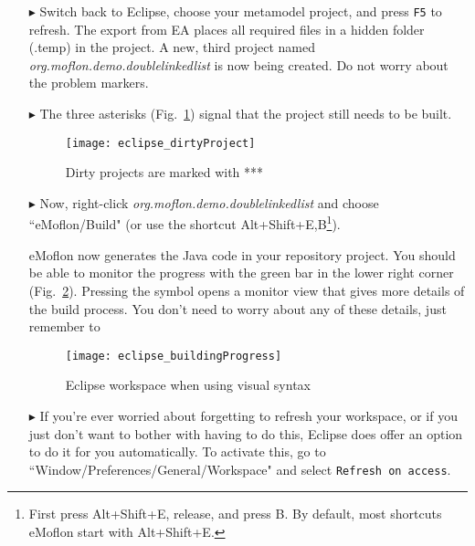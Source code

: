 \begin{itemize}
\item[$\blacktriangleright$] Switch back to Eclipse, choose your metamodel project, and press \texttt{F5} to refresh. 
The export from EA places all required files in a hidden folder (.temp) in the project.
A new, third project named \emph{org.moflon.demo.doublelinkedlist} is now being created.
Do not worry about the problem markers.

\item[$\blacktriangleright$] The three asterisks (Fig.~\ref{eclipse:dirty-project}) signal that the project still needs to be built.

\vspace{0.5cm}

\begin{figure}[htbp]
    \centering
    \texttt{[image: eclipse\_dirtyProject]}
    \caption{Dirty projects are marked with ***} 
    \label{eclipse:dirty-project} 
\end{figure}

\vspace{0.5cm}

\item[$\blacktriangleright$] Now, right-click \emph{org.moflon.demo.doublelinkedlist} and choose ``eMoflon/Build" (or use the shortcut Alt+Shift+E,B\footnote{First press Alt+Shift+E, release, and press B.
By default, most shortcuts eMoflon start with Alt+Shift+E.}).

eMoflon now generates the Java code in your repository project.
You should be able to monitor the progress with the green bar in the lower right corner (Fig.~\ref{eclipse:build}). Pressing the
symbol opens a monitor view that gives more details of the build process. You don't need to worry about any of these details, just remember to 

\begin{figure}[htbp]
    \centering
    \texttt{[image: eclipse\_buildingProgress]}
    \caption{Eclipse workspace when using visual syntax} 
    \label{eclipse:build} 
\end{figure}

\item[$\blacktriangleright$] If you're ever worried about forgetting to refresh your workspace, or if you just don't want to bother with having to do this,
Eclipse does offer an option to do it for you automatically. To activate this, go to ``Window/Preferences/General/Workspace" and select \texttt{Refresh on
access}.

\end{itemize}